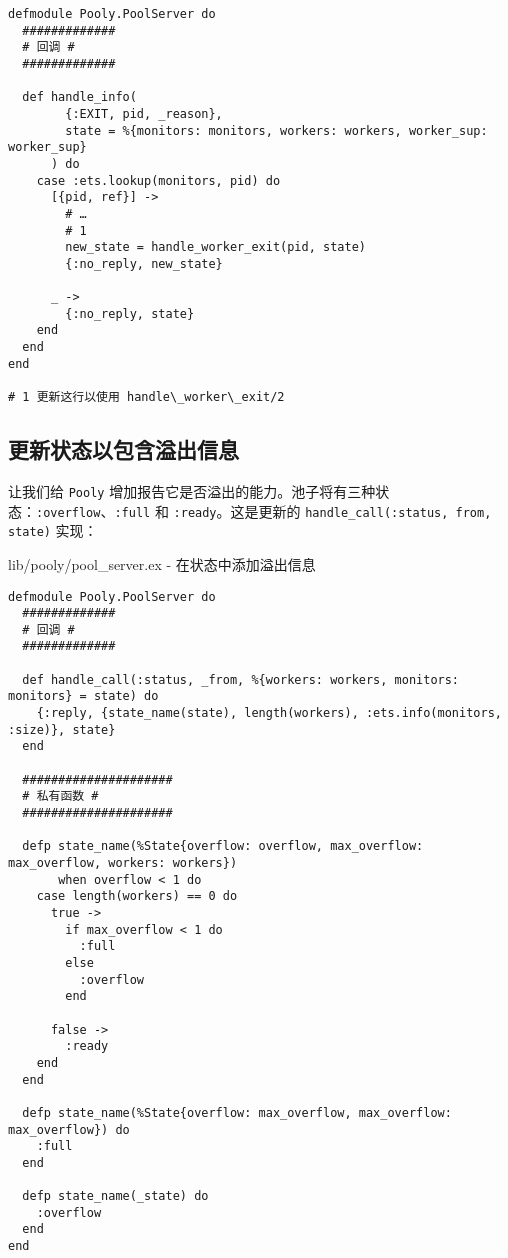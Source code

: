 \begin{code}{}
\begin{verbatim}
defmodule Pooly.PoolServer do
  #############
  # 回调 #
  #############

  def handle_info(
        {:EXIT, pid, _reason},
        state = %{monitors: monitors, workers: workers, worker_sup: worker_sup}
      ) do
    case :ets.lookup(monitors, pid) do
      [{pid, ref}] ->
        # …
        # 1
        new_state = handle_worker_exit(pid, state)
        {:no_reply, new_state}

      _ ->
        {:no_reply, state}
    end
  end
end

# 1 更新这行以使用 handle\_worker\_exit/2
\end{verbatim}
\end{code}


\subsection{更新状态以包含溢出信息}

让我们给 \texttt{Pooly}
增加报告它是否溢出的能力。池子将有三种状态：\texttt{:overflow}、\texttt{:full}
和 \texttt{:ready}。这是更新的
\texttt{handle\_call(:status, from, state)} 实现：

\begin{code}{lib/pooly/pool\_server.ex - 在状态中添加溢出信息}

\begin{verbatim}
defmodule Pooly.PoolServer do
  #############
  # 回调 #
  #############

  def handle_call(:status, _from, %{workers: workers, monitors: monitors} = state) do
    {:reply, {state_name(state), length(workers), :ets.info(monitors, :size)}, state}
  end

  #####################
  # 私有函数 #
  #####################

  defp state_name(%State{overflow: overflow, max_overflow: max_overflow, workers: workers})
       when overflow < 1 do
    case length(workers) == 0 do
      true ->
        if max_overflow < 1 do
          :full
        else
          :overflow
        end

      false ->
        :ready
    end
  end

  defp state_name(%State{overflow: max_overflow, max_overflow: max_overflow}) do
    :full
  end

  defp state_name(_state) do
    :overflow
  end
end
\end{verbatim}
\end{code}

